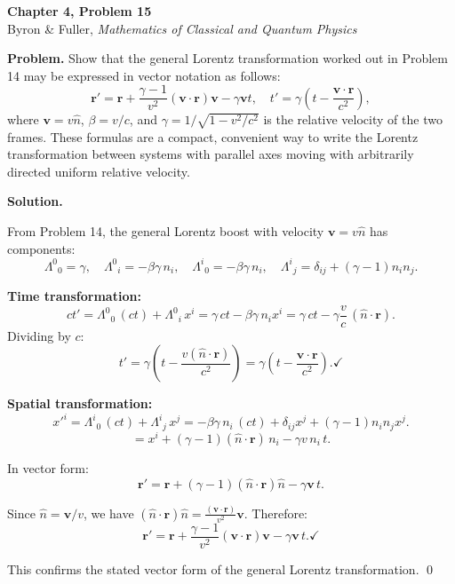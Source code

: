 \documentclass[12pt]{article}
\begin{document}
\begin{center}
{\Large\bfseries Chapter 4, Problem 15}\\[6pt]
Byron \& Fuller, \textit{Mathematics of Classical and Quantum Physics}
\end{center}

\bigskip

\textbf{Problem.} Show that the general Lorentz transformation worked out in Problem 14 may be expressed in vector notation as follows:
\[
\mathbf{r}' = \mathbf{r} + \frac{\gamma - 1}{v^2}(\mathbf{v}\cdot\mathbf{r})\mathbf{v} - \gamma\mathbf{v}t, \quad t' = \gamma\!\left(t - \frac{\mathbf{v}\cdot\mathbf{r}}{c^2}\right),
\]
where $\mathbf{v} = v\hat{n}$, $\beta = v/c$, and $\gamma = 1/\sqrt{1-v^2/c^2}$ is the relative velocity of the two frames. These formulas are a compact, convenient way to write the Lorentz transformation between systems with parallel axes moving with arbitrarily directed uniform relative velocity.

\bigskip
\textbf{Solution.}

From Problem 14, the general Lorentz boost with velocity $\mathbf{v} = v\hat{n}$ has components:
\[
\Lambda^{0}{}_{0} = \gamma, \quad \Lambda^{0}{}_{i} = -\beta\gamma\, n_i, \quad \Lambda^{i}{}_{0} = -\beta\gamma\, n_i, \quad \Lambda^{i}{}_{j} = \delta_{ij} + (\gamma-1)n_i n_j.
\]

\textbf{Time transformation:}
\[
ct' = \Lambda^{0}{}_{0}\,(ct) + \Lambda^{0}{}_{i}\,x^i = \gamma\, ct - \beta\gamma\, n_i x^i = \gamma\, ct - \gamma\frac{v}{c}\,(\hat{n}\cdot\mathbf{r}).
\]
Dividing by $c$:
\[
t' = \gamma\!\left(t - \frac{v(\hat{n}\cdot\mathbf{r})}{c^2}\right) = \gamma\!\left(t - \frac{\mathbf{v}\cdot\mathbf{r}}{c^2}\right). \checkmark
\]

\textbf{Spatial transformation:}
\[
x'^i = \Lambda^{i}{}_{0}\,(ct) + \Lambda^{i}{}_{j}\,x^j = -\beta\gamma\, n_i\,(ct) + \delta_{ij}x^j + (\gamma-1)n_i n_j x^j.
\]
\[
= x^i + (\gamma-1)(\hat{n}\cdot\mathbf{r})\,n_i - \gamma v\, n_i\, t.
\]

In vector form:
\[
\mathbf{r}' = \mathbf{r} + (\gamma-1)(\hat{n}\cdot\mathbf{r})\hat{n} - \gamma\mathbf{v}\,t.
\]

Since $\hat{n} = \mathbf{v}/v$, we have $(\hat{n}\cdot\mathbf{r})\hat{n} = \frac{(\mathbf{v}\cdot\mathbf{r})}{v^2}\mathbf{v}$. Therefore:
\[
\mathbf{r}' = \mathbf{r} + \frac{\gamma-1}{v^2}(\mathbf{v}\cdot\mathbf{r})\mathbf{v} - \gamma\mathbf{v}\,t. \checkmark
\]

This confirms the stated vector form of the general Lorentz transformation. \qed
\end{document}
